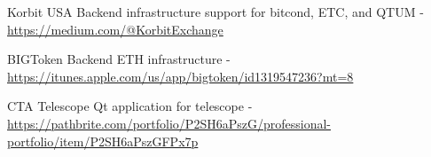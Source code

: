 


\begin{cvskills}


\cvskill
{Korbit USA} %
{Backend infrastructure support for bitcond, ETC, and QTUM - \url{https://medium.com/@KorbitExchange}} %

\cvskill
{BIGToken} %
{Backend ETH infrastructure - \url{https://itunes.apple.com/us/app/bigtoken/id1319547236?mt=8}} %

\cvskill
{CTA Telescope} %
{Qt application for telescope - \url{https://pathbrite.com/portfolio/P2SH6aPszG/professional-portfolio/item/P2SH6aPszGFPx7p}} %

\end{cvskills}
